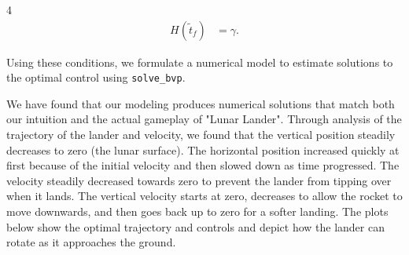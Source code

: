 \documentclass[a0]{4by3}
\newcommand{\NumColumns}{4}
\begin{document}
\begin{minipage}{\linewidth + 2\fboxsep}
\begin{multicols*}{\NumColumns}
\begin{align*}
    H(\tilde{t}_f) &= \gamma.
\end{align*}


Using these conditions, we formulate a numerical model to estimate solutions to the optimal control using \texttt{solve\_bvp}.


            
        

        \vspace{2cm}





        
We have found that our modeling produces numerical solutions that match both our intuition and the actual gameplay of "Lunar Lander". Through analysis of the trajectory of the lander and velocity, we found that the vertical position steadily decreases to zero (the lunar surface). The horizontal position increased quickly at first because of the initial velocity and then slowed down as time progressed. The velocity steadily decreased towards zero to prevent the lander from tipping over when it lands. The vertical velocity starts at zero, decreases to allow the rocket to move downwards, and then goes back up to zero for a softer landing.
The plots below show the optimal trajectory and controls and depict how the lander can rotate as it approaches the ground.
    



\end{multicols*}
\end{minipage}
\end{document}
